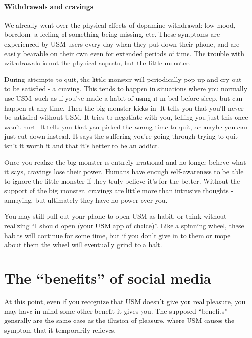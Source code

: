 \documentclass[
]{book}
\begin{document}
\subsubsection*{Withdrawals and cravings}\label{withdrawals-and-cravings}

We already went over the physical effects of dopamine withdrawal: low mood, boredom, a feeling of something being missing, etc. These symptoms are experienced by USM users every day when they put down their phone, and are easily bearable on their own even for extended periods of time. The trouble with withdrawals is not the physical aspects, but the little monster.

During attempts to quit, the little monster will periodically pop up and cry out to be satisfied - a craving. This tends to happen in situations where you normally use USM, such as if you've made a habit of using it in bed before sleep, but can happen at any time. Then the big monster kicks in. It tells you that you'll never be satisfied without USM. It tries to negotiate with you, telling you just this once won't hurt. It tells you that you picked the wrong time to quit, or maybe you can just cut down instead. It says the suffering you're going through trying to quit isn't it worth it and that it's better to be an addict.

Once you realize the big monster is entirely irrational and no longer believe what it says, cravings lose their power. Humans have enough self-awareness to be able to ignore the little monster if they truly believe it's for the better. Without the support of the big monster, cravings are little more than intrusive thoughts - annoying, but ultimately they have no power over you.

You may still pull out your phone to open USM as habit, or think without realizing ``I should open (your USM app of choice)''. Like a spinning wheel, these habits will continue for some time, but if you don't give in to them or mope about them the wheel will eventually grind to a halt.

\chapter{The ``benefits'' of social media}\label{benefits}

At this point, even if you recognize that USM doesn't give you real pleasure, you may have in mind some other benefit it gives you. The supposed ``benefits'' generally are the same case as the illusion of pleasure, where USM causes the symptom that it temporarily relieves.
\end{document}
